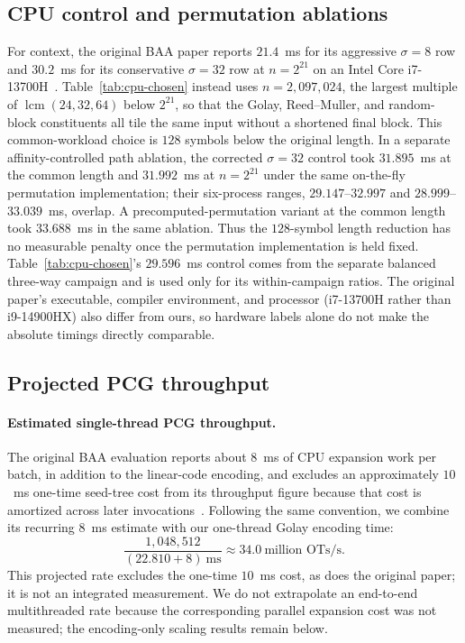 \subsection{CPU control and permutation ablations}
\label{app:ablations}

For context, the original BAA paper reports $21.4$~ms for its aggressive
$\sigma=8$ row and $30.2$~ms for its conservative $\sigma=32$ row at
$n=2^{21}$ on an Intel Core i7-13700H~\cite{baa26}.  Table~\ref{tab:cpu-chosen}
instead uses $n=2{,}097{,}024$, the largest multiple of
$\operatorname{lcm}(24,32,64)$ below $2^{21}$, so that the Golay,
Reed--Muller, and random-block constituents all tile the same input without a
shortened final block.  This common-workload choice is $128$ symbols below the
original length.  In a separate affinity-controlled path ablation, the
corrected $\sigma=32$ control took $31.895$~ms at the common length and
$31.992$~ms at $n=2^{21}$ under the same on-the-fly permutation implementation;
their six-process ranges, $29.147$--$32.997$ and $28.999$--$33.039$~ms, overlap.
A precomputed-permutation variant at the common length took $33.688$~ms in the
same ablation.  Thus the $128$-symbol length reduction has no measurable
penalty once the permutation implementation is held fixed.
Table~\ref{tab:cpu-chosen}'s $29.596$~ms
control comes from the separate balanced three-way campaign and is used only
for its within-campaign ratios.  The original paper's executable, compiler
environment, and processor (i7-13700H rather than i9-14900HX) also differ from
ours, so hardware labels alone do not make the absolute timings directly
comparable.




\subsection{Projected PCG throughput}
\label{app:pcg-throughput}

\paragraph{Estimated single-thread PCG throughput.}
The original BAA evaluation reports about $8$~ms of CPU expansion work per
batch, in addition to the linear-code encoding, and excludes an approximately
$10$~ms one-time seed-tree cost from its throughput figure because that cost is
amortized across later invocations~\cite{baa26}.  Following the same convention,
we combine its recurring $8$~ms estimate with our one-thread Golay encoding time:
\[
  \frac{1{,}048{,}512}{(22.810+8)\ \mathrm{ms}}
  \approx 34.0\ \text{million OTs/s}.
\]
This projected rate excludes the one-time $10$~ms cost, as does the original
paper; it is not an integrated measurement.  We do not extrapolate an
end-to-end multithreaded rate because the corresponding parallel expansion cost
was not measured; the encoding-only scaling results remain below.





